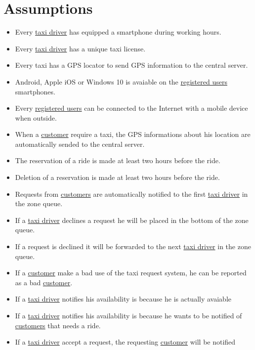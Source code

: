 \documentclass{report}
\begin{document}
	\section{Assumptions}

			\begin{itemize}
				\item Every \hyperref[sec:tdriver]{taxi driver} has equipped a smartphone during working hours.

				\item Every \hyperref[sec:tdriver]{taxi driver} has a unique taxi license.

				\item Every taxi has a GPS locator to send GPS information to the central server.

				\item Android, Apple iOS or Windows 10 is avaiable on the \hyperref[sec:ruser]{registered users} smartphones.

				\item Every \hyperref[sec:ruser]{registered users} can be connected to the Internet with a mobile device when outside.

				\item When a \hyperref[sec:customer]{customer} require a taxi, the GPS informations about his location are automatically sended to the central server.

				\item The reservation of a ride is made at least two hours before the ride.

				\item Deletion of a reservation is made at least two hours before the ride.

				\item Requests from \hyperref[sec:customer]{customers} are automatically notified to the first \hyperref[sec:tdriver]{taxi driver} in the zone queue.

				\item If a \hyperref[sec:tdriver]{taxi driver} declines a request he will be placed in the bottom of the zone queue.

				\item If a request is declined it will be forwarded to the next \hyperref[sec:tdriver]{taxi driver} in the zone queue.

				\item If a \hyperref[sec:customer]{customer} make a bad use of the taxi request system, he can be reported as a bad \hyperref[sec:customer]{customer}.

				\item If a \hyperref[sec:tdriver]{taxi driver} notifies his availability is because he is actually avaiable

				\item If a \hyperref[sec:tdriver]{taxi driver} notifies his availability is because he wants to be notified of \hyperref[sec:customer]{customers} that needs a ride.

				\item If a \hyperref[sec:tdriver]{taxi driver} accept a request, the requesting \hyperref[sec:customer]{customer} will be notified
			\end{itemize}
\end{document}
